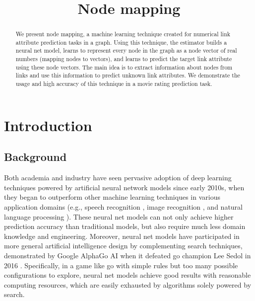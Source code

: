 \documentclass{article}
\begin{document}
\lstset{language=python, tabsize=4}
\title{Node mapping}
\maketitle

\begin{abstract}
	We present node mapping, a machine learning technique created for numerical 
	link attribute prediction tasks in a graph.
	Using this technique, the estimator builds a neural net model, learns to 
	represent every node in the graph as a node vector of real numbers (mapping 
	nodes to vectors), and learns to predict the target link attribute using 
	these node vectors.
	The main idea is to extract information about nodes from links and use this 
	information to predict unknown link attributes.
	We demonstrate the usage and high accuracy of this technique in a movie 
	rating prediction task.
\end{abstract}

\section{Introduction}

\subsection{Background}
Both academia and industry have seen pervasive adoption of deep learning 
techniques powered by artificial neural network models since early 2010s, when 
they began to outperform other machine learning techniques in various 
application domains (e.g., speech recognition \cite{hannun2014deep}, image 
recognition \cite{simonyan2014very}, and natural language processing 
\cite{yao2013recurrent}).
These neural net models can not only achieve higher prediction accuracy than 
traditional models, but also require much less domain knowledge and engineering.
Moreover, neural net models have participated in more general artificial 
intelligence design by complementing search techniques, demonstrated by
Google AlphaGo AI when it defeated go champion Lee Sedol in 2016 
\cite{silver2016mastering}.
Specifically, in a game like go with simple rules but too many possible 
configurations to explore, neural net models achieve good results with 
reasonable computing resources, which are easily exhausted by algorithms solely 
powered by search.
\end{document}
